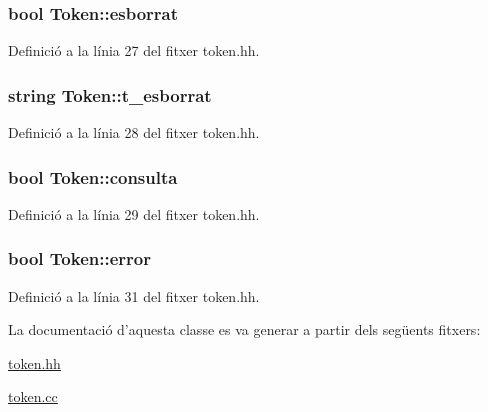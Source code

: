 \hypertarget{class_token_a696eb24f3f0cce53d3b062973013c347}{
\subsubsection[{esborrat}]{\setlength{\rightskip}{0pt plus 5cm}bool Token\-::esborrat\hspace{0.3cm}{\ttfamily [private]}}}\label{class_token_a696eb24f3f0cce53d3b062973013c347}


Definició a la línia 27 del fitxer token.\-hh.

\hypertarget{class_token_a4ebbfc5ad34b5a4e9220789cbf0dfafe}{
\subsubsection[{t\-\_\-esborrat}]{\setlength{\rightskip}{0pt plus 5cm}string Token\-::t\-\_\-esborrat\hspace{0.3cm}{\ttfamily [private]}}}\label{class_token_a4ebbfc5ad34b5a4e9220789cbf0dfafe}


Definició a la línia 28 del fitxer token.\-hh.

\hypertarget{class_token_a4479e876476db5ccd360ad3906d47eff}{
\subsubsection[{consulta}]{\setlength{\rightskip}{0pt plus 5cm}bool Token\-::consulta\hspace{0.3cm}{\ttfamily [private]}}}\label{class_token_a4479e876476db5ccd360ad3906d47eff}


Definició a la línia 29 del fitxer token.\-hh.

\hypertarget{class_token_a087a46025ff3eb94c844aba0204ce08a}{
\subsubsection[{error}]{\setlength{\rightskip}{0pt plus 5cm}bool Token\-::error\hspace{0.3cm}{\ttfamily [private]}}}\label{class_token_a087a46025ff3eb94c844aba0204ce08a}


Definició a la línia 31 del fitxer token.\-hh.



La documentació d'aquesta classe es va generar a partir dels següents fitxers\-:\begin{DoxyCompactItemize}
\item 
\hyperlink{token_8hh}{token.\-hh}\item 
\hyperlink{token_8cc}{token.\-cc}\end{DoxyCompactItemize}
